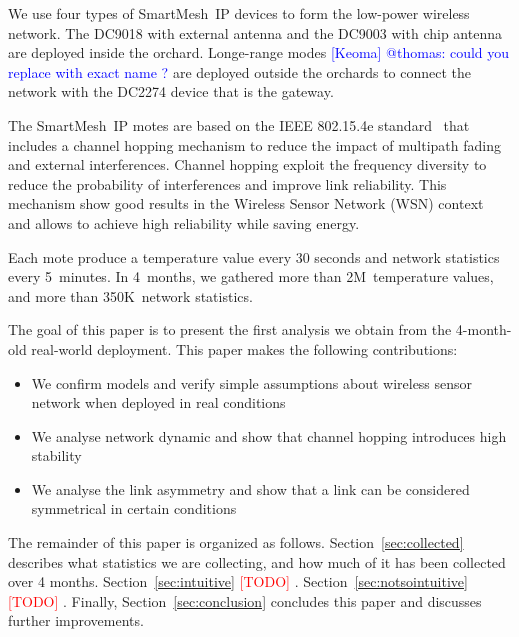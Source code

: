 \documentclass{sig-alternate}
\newcommand{\todo}[1]        {\textcolor{red}{[TODO] #1}}
\newcommand{\keoma}[1]       {\textcolor{blue}{[Keoma] #1}}
\newcommand{\smip}           {SmartMesh~IP\xspace}
\begin{document}

We use four types of \smip devices to form the low-power wireless network.
The DC9018 with external antenna and the DC9003 with chip antenna are deployed inside the orchard.
Longe-range modes \keoma{@thomas: could you replace with exact name ?} are deployed outside the orchards to connect the network with the DC2274 device that is the gateway.


The \smip motes are based on the IEEE 802.15.4e standard~\cite{std_ieee802154e} that includes a channel hopping mechanism to reduce the impact of multipath fading and external interferences.
Channel hopping exploit the frequency diversity to reduce the probability of interferences and improve link reliability.
This mechanism show good results in the Wireless Sensor Network (WSN) context~\cite{watteyne2010mitigating, watteyne2009reliability} and allows to achieve high reliability while saving energy.


Each mote produce a temperature value every 30 seconds and network statistics every 5~minutes.
In 4~months, we gathered more than 2M~temperature values, and more than 350K~network statistics.


The goal of this paper is to present the first analysis we obtain from the 4-month-old real-world deployment.
This paper makes the following contributions:
\begin{itemize}
    \item We confirm models and verify simple assumptions about wireless sensor network when deployed in real conditions
    \item We analyse network dynamic and show that channel hopping introduces high stability
    \item We analyse the link asymmetry and show that a link can be considered symmetrical in certain conditions
\end{itemize}


The remainder of this paper is organized as follows.
Section~\ref{sec:collected} describes what statistics we are collecting, and how much of it has been collected over 4 months.
Section~\ref{sec:intuitive} \todo{}.
Section~\ref{sec:notsointuitive} \todo{}.
Finally, Section~\ref{sec:conclusion} concludes this paper and discusses further improvements.
\end{document}
